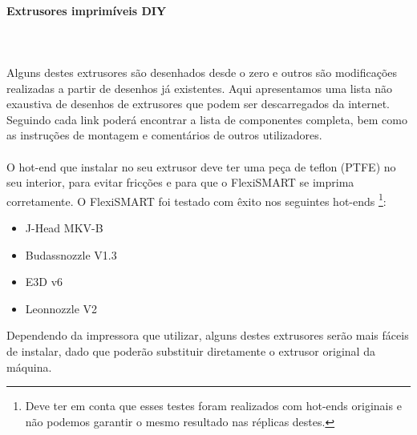 \documentclass[11pt,a4paper]{article}
\begin{document}
			\paragraph{Extrusores imprimíveis DIY}\mbox{}\\\\
Alguns destes extrusores são desenhados desde o zero e outros são modificações realizadas a partir de desenhos já existentes. Aqui apresentamos uma lista não exaustiva de desenhos de extrusores que podem ser descarregados da internet. Seguindo cada link poderá encontrar a lista de componentes completa, bem como as instruções de montagem e comentários de outros utilizadores.
\\\\
O hot-end que instalar no seu extrusor deve ter uma peça de teflon (PTFE) no seu interior, para evitar fricções e para que o FlexiSMART se imprima corretamente. O FlexiSMART foi testado com êxito nos seguintes hot-ends \footnote{Deve ter em conta que esses testes foram realizados com hot-ends originais e não podemos garantir o mesmo resultado nas réplicas destes.}:
\begin{itemize}
\item J-Head MKV-B
\item Budassnozzle V1.3
\item E3D v6
\item Leonnozzle V2
\end{itemize}
Dependendo da impressora que utilizar, alguns destes extrusores serão mais fáceis de instalar, dado que poderão substituir diretamente o extrusor original da máquina.
\end{document}
